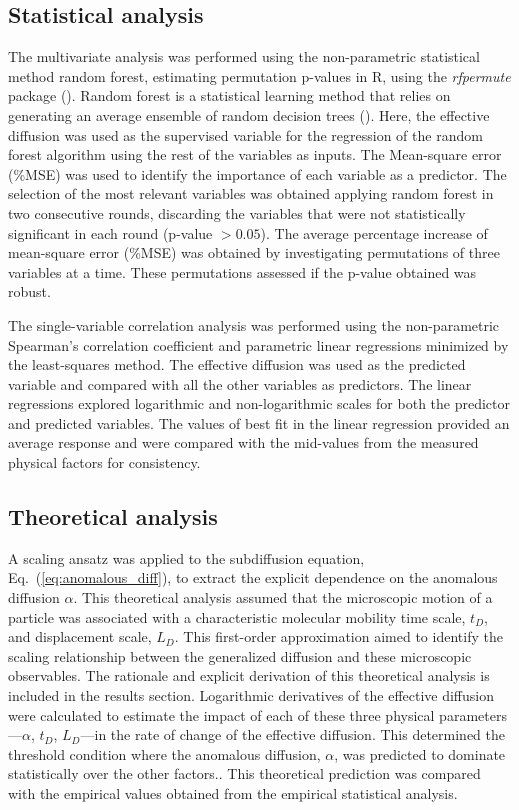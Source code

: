 \documentclass[aps,prl,preprint,superscriptaddress,showkeys,linenumbers]{revtex4-1}
\begin{document}
\subsection*{Statistical analysis}
The multivariate analysis was performed using the non-parametric statistical method random forest, estimating permutation p-values in R\textcolor{Antonio}{, using the \textit{rfpermute} package} (\cite{rfPermute}).
\textcolor{Antonio}{Random forest is a statistical learning method that relies on generating an average ensemble of random decision trees (\cite{James2013StatsLearningBook}). Here, the effective diffusion was used as the supervised variable for the regression of the random forest algorithm using the rest of the variables as inputs. The Mean-square error (\%MSE) was used to identify the importance of each variable as a predictor. The selection of the most relevant variables was obtained applying random forest in two consecutive rounds,}
discarding the variables that were not statistically significant in each round (p-value $> 0.05$). The average percentage increase of mean-square error (\%MSE) was obtained by investigating permutations of three variables at a time. These permutations assessed if the p-value obtained was robust. 

The single-variable correlation analysis was performed using the non-parametric Spearman's correlation coefficient and parametric linear regressions minimized by the least-squares method. The effective diffusion was used as the predicted variable and compared with all the other variables as predictors. The linear regressions explored logarithmic and non-logarithmic scales for both the predictor and predicted variables. \textcolor{Antonio}{The values of best fit in the linear regression provided an average response and were compared with the mid-values from the measured physical factors for consistency.}

\subsection*{Theoretical analysis}
A scaling ansatz was applied to the subdiffusion equation, Eq.~(\ref{eq:anomalous_diff}), to extract the explicit dependence on the anomalous diffusion $\alpha$. \textcolor{Antonio}{This theoretical analysis assumed that the microscopic motion of a particle was associated with a characteristic molecular mobility time scale, $t_D$, and displacement scale, $L_D$. This first-order approximation aimed to identify the scaling relationship between the generalized diffusion and these microscopic observables}. The rationale and explicit derivation of this theoretical analysis is included in the results section. Logarithmic derivatives of the effective diffusion were calculated to estimate the impact of each of these three physical parameters---$\alpha$, $t_D$, $L_D$---in the rate of change of the effective diffusion. This determined the threshold condition where the anomalous diffusion, $\alpha$, \textcolor{Antonio}{was predicted to dominate statistically} over the other \textcolor{Antonio}{factors.}. This theoretical prediction was compared with the empirical values obtained from the empirical statistical analysis.
\end{document}
